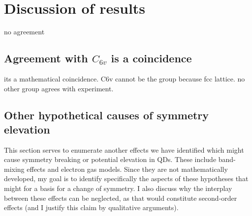 \section{Discussion of results}

no agreement

\subsection{Agreement with $C_{6v}$ is a coincidence}
its a mathematical coincidence. C6v cannot be the group because fcc lattice. no other group agrees with experiment.

\subsection{Other hypothetical causes of symmetry elevation}
This section serves to enumerate another effects we have identified which might cause symmetry breaking or potential elevation in QDs. These include band-mixing effects and electron gas models. Since they are not mathematically developed, my goal is to identify specifically the aspects of these hypotheses that might for a basis for a change of symmetry. I also discuss why the interplay between these effects can be neglected, as that would constitute second-order effects (and I justify this claim by qualitative arguments).

